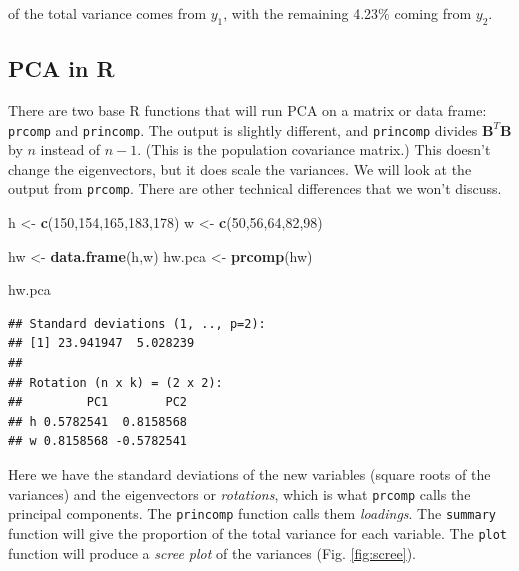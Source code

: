 \documentclass[
]{book}
\newenvironment{Shaded}{\begin{snugshade}}{\end{snugshade}}
\newcommand{\DecValTok}[1]{\textcolor[rgb]{0.00,0.00,0.81}{#1}}
\newcommand{\FunctionTok}[1]{\textcolor[rgb]{0.13,0.29,0.53}{\textbf{#1}}}
\newcommand{\NormalTok}[1]{#1}
\newcommand{\OtherTok}[1]{\textcolor[rgb]{0.56,0.35,0.01}{#1}}
\theoremstyle{definition}
\theoremstyle{definition}
\theoremstyle{definition}
\theoremstyle{definition}
\theoremstyle{remark}
\begin{document}
of the total variance comes from \(y_1\), with the remaining 4.23\% coming from \(y_2\).

\subsection*{PCA in R}\label{pca-in-r}

There are two base R functions that will run PCA on a matrix or data frame: \texttt{prcomp} and \texttt{princomp}. The output is slightly different, and \texttt{princomp} divides \(\mathbf{B}^T\mathbf{B}\) by \(n\) instead of \(n-1\). (This is the population covariance matrix.) This doesn't change the eigenvectors, but it does scale the variances. We will look at the output from \texttt{prcomp}. There are other technical differences that we won't discuss.

\begin{Shaded}
\begin{Highlighting}[]
\NormalTok{h }\OtherTok{\textless{}{-}} \FunctionTok{c}\NormalTok{(}\DecValTok{150}\NormalTok{,}\DecValTok{154}\NormalTok{,}\DecValTok{165}\NormalTok{,}\DecValTok{183}\NormalTok{,}\DecValTok{178}\NormalTok{)}
\NormalTok{w }\OtherTok{\textless{}{-}} \FunctionTok{c}\NormalTok{(}\DecValTok{50}\NormalTok{,}\DecValTok{56}\NormalTok{,}\DecValTok{64}\NormalTok{,}\DecValTok{82}\NormalTok{,}\DecValTok{98}\NormalTok{)}

\NormalTok{hw }\OtherTok{\textless{}{-}} \FunctionTok{data.frame}\NormalTok{(h,w)}
\NormalTok{hw.pca }\OtherTok{\textless{}{-}} \FunctionTok{prcomp}\NormalTok{(hw)}

\NormalTok{hw.pca}
\end{Highlighting}
\end{Shaded}

\begin{verbatim}
## Standard deviations (1, .., p=2):
## [1] 23.941947  5.028239
## 
## Rotation (n x k) = (2 x 2):
##         PC1        PC2
## h 0.5782541  0.8158568
## w 0.8158568 -0.5782541
\end{verbatim}

Here we have the standard deviations of the new variables (square roots of the variances) and the eigenvectors or \emph{rotations}, which is what \texttt{prcomp} calls the principal components. The \texttt{princomp} function calls them \emph{loadings}. The \texttt{summary} function will give the proportion of the total variance for each variable. The \texttt{plot} function will produce a \emph{scree plot} of the variances (Fig. \ref{fig:scree}).
\end{document}
